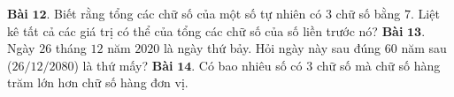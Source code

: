 \begin{multicols}{2}
	\textbf{Bài} $\pmb{12.}$ Biết rằng tổng các chữ số của một số tự nhiên có $3$ chữ số bằng $7$. Liệt kê tất cả các giá trị có thể của tổng các chữ số của số liền trước nó? 
	\vskip 0.1cm
	\vskip 0.1cm
	\textbf{Bài} $\pmb{13.}$ Ngày $26$ tháng $12$ năm $2020$ là ngày thứ bảy. Hỏi ngày này sau đúng $60$ năm sau ($26/12/2080$) là thứ mấy?
	\vskip 0.1cm
	\vskip 0.1cm
	\textbf{Bài} $\pmb{14.}$ Có bao nhiêu số có $3$ chữ số mà chữ số hàng trăm lớn hơn chữ số hàng đơn vị.
	\vskip 0.1cm

\end{multicols}
